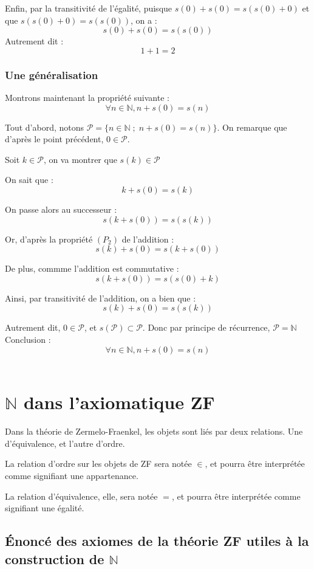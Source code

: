 \documentclass{article}
\begin{document}
Enfin, par la transitivité de l'égalité, puisque $s(0)+s(0)=s(s(0)+0)$ et que $s(s(0)+0)=s(s(0))$, on a :
$$\boxed{s(0)+s(0)=s(s(0))}$$
Autrement dit :
$$\boxed{1+1=2}$$

\subsubsection{Une généralisation}
Montrons maintenant la propriété suivante :
$$\forall n \in \mathbb{N}, n + s(0) = s(n)$$

Tout d'abord, notons $\mathcal{P} = \{ n \in \mathbb{N} \; ; \; n + s(0) = s(n) \}$. On remarque que d'après le point précédent, $0 \in \mathcal{P}$.

Soit $k \in \mathcal{P}$, on va montrer que $s(k) \in \mathcal{P}$

On sait que : 
$$k + s(0) = s(k)$$

On passe alors au successeur :
$$s(k+s(0)) = s(s(k))$$

Or, d'après la propriété $(P_2)$ de l'addition :
$$s(k) + s(0) = s(k + s(0))$$

De plus, commme l'addition est commutative :
$$s(k + s(0)) = s(s(0) + k)$$

Ainsi, par transitivité de l'addition, on a bien que :
$$s(k) + s(0) = s(s(k))$$

Autrement dit, $0 \in \mathcal{P}$, et $s(\mathcal{P}) \subset \mathcal{P}$. Donc par principe de récurrence, $\mathcal{P} = \mathbb{N}$
\\

Conclusion : 
$$\boxed{\forall n \in \mathbb{N}, n + s(0) = s(n)}$$
\\

\section{$\mathbb{N}$ dans l'axiomatique ZF}

Dans la théorie de Zermelo-Fraenkel, les objets sont liés par deux relations. Une d'équivalence, et l'autre d'ordre.

La relation d'ordre sur les objets de ZF sera notée $\in$, et pourra être interprétée comme signifiant une appartenance.

La relation d'équivalence, elle, sera notée $=$, et pourra être interprétée comme signifiant une égalité.

\subsection{Énoncé des axiomes de la théorie ZF utiles à la construction de $\mathbb{N}$}
\end{document}
